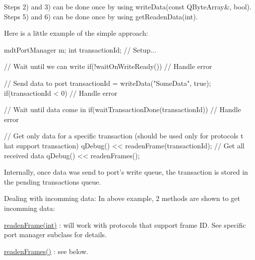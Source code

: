 Steps 2) and 3) can be done once by using writeData(const QByteArray\&, bool). Steps 5) and 6) can be done once by using getReadenData(int).

Here is a little example of the simple approach: 
\begin{DoxyCode}
 mdtPortManager m;
 int transactionId;
 // Setup...

 // Wait until we can write
 if(!waitOnWriteReady()){
   // Handle error
 }

 // Send data to port
 transactionId = writeData("SomeData", true);
 if(transactionId < 0){
   // Handle error
 }

 // Wait until data come in
 if(waitTransactionDone(transactionId)){
   // Handle error
 }

 // Get only data for a specific transaction (should be used only for protocols t
      hat support transaction)
 qDebug() << readenFrame(transactionId);
 // Get all received data
 qDebug() << readenFrames();
\end{DoxyCode}


Internally, once data was send to port's write queue, the transaction is stored in the pending transactions queue.

Dealing with incomming data: In above example, 2 methods are shown to get incomming data:
\begin{DoxyItemize}
\item \hyperlink{classmdt_port_manager_a830ae182d06dd6a52c43a7f45b9240ac}{readenFrame(int)} : will work with protocols that support frame ID. See specific port manager subclass for details.
\item \hyperlink{classmdt_port_manager_addd5dcae9644cea42a9871205af41796}{readenFrames()} : see below.
\end{DoxyItemize}

